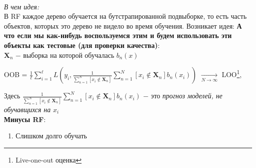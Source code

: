         
        \underline{}\\

        \textit{В чем идея:}\\

        В RF каждое дерево обучается на бутстрапированной подвыборке, то есть часть объектов, которых это дерево не видело во время обучения. Возникает идея: \textbf{А что если мы как-нибудь воспользуемся этим и будем использовать эти объекты как тестовые (для проверки качества)}:\\

        
        $\mathbf{X}_n$ $-$ выборка на которой обучалась $b_n(x)$\\

        \begin{center}
        \Large
            OOB = $\frac{1}{\ell}\sum\limits_{i = 1}^\ell L(y_i, \frac{1}{\sum\limits_{n = 1}^N[x_i \notin \mathbf{X}_n]}\sum\limits_{n = 1}^N[x_i \notin \mathbf{X}_n ]b_n(x_i))$ $\to\limits_{N \longrightarrow \infty}$ LOO\footnote{Live-one-out оценка},
        \end{center}
        Здесь $\frac{1}{\sum\limits_{n = 1}^N[x_i \notin \mathbf{X}_n]}\sum\limits_{n = 1}^N[x_i \notin \mathbf{X}_n ]b_n(x_i)$ $-$ это \textit{прогноз моделей, не обучавщихся на $x_i$}\\


        
        \textbf{Минусы RF}:
        \begin{enumerate}
            \item Слишком долго обучать

        \end{enumerate}

